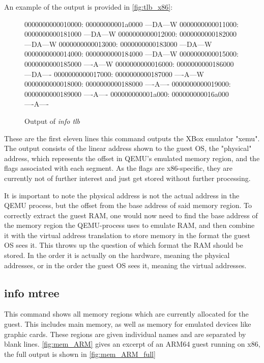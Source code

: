 An example of the output is provided in \autoref{fig:tlb_x86}:

\begin{figure}[H]
\begin{ffcode}
    0000000000010000: 00000000001a0000 ---DA---W
    0000000000011000: 0000000000181000 ---DA---W
    0000000000012000: 0000000000182000 ---DA---W
    0000000000013000: 0000000000183000 ---DA---W
    0000000000014000: 0000000000184000 ---DA---W
    0000000000015000: 0000000000185000 ----A---W
    0000000000016000: 0000000000186000 ---DA----
    0000000000017000: 0000000000187000 ----A---W
    0000000000018000: 0000000000188000 ----A----
    0000000000019000: 0000000000189000 ----A----
    000000000001a000: 000000000016a000 ----A----
\end{ffcode}
\caption{Output of \emph{info tlb}}
\label{fig:tlb_x86}
\end{figure}

These are the first eleven lines this command outputs the XBox emulator "xemu"\cite{xemu}.
The output consists of the linear address shown to the guest OS, the "physical" address, which represents the offset in QEMU's emulated memory region,
and the flags associated with each segment.
As the flags are x86-specific, they are currently not of further interest and just get stored without further processing.

It is important to note the physical address is not the actual address in the QEMU process, but the offset from the base address of said memory region.
To correctly extract the guest RAM, one would now need to find the base address of the memory region the QEMU-process uses to emulate RAM,
and then combine it with the virtual address translation to store memory in the format the guest OS sees it.
This throws up the question of which format the RAM should be stored. In the order it is actually on the hardware, meaning the physical addresses,
or in the order the guest OS sees it, meaning the virtual addresses.

\subsection{info mtree}\label{sec:API_mtree}
This command shows all memory regions which are currently allocated for the guest.
This includes main memory, as well as memory for emulated devices like graphic cards.
These regions are given individual names and are separated by blank lines.
\autoref{fig:mem_ARM} gives an excerpt of an ARM64 guest running on x86,
the full output is shown in \autoref{fig:mem_ARM_full}

